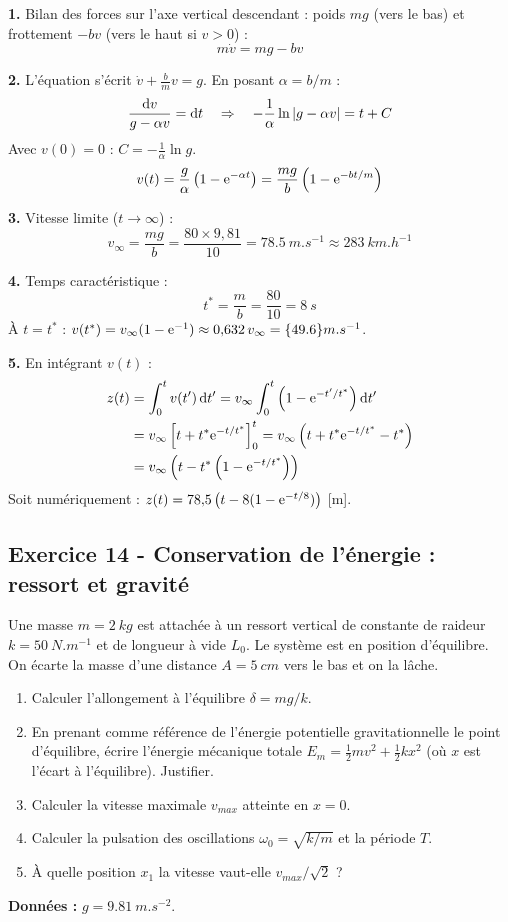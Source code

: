 \documentclass[12pt,a4paper]{article}
\begin{document}
\begin{boitecorrige}
\textbf{1.} Bilan des forces sur l'axe vertical descendant : poids $mg$ (vers le bas) et frottement $-bv$ (vers le haut si $v > 0$) :
\[
m\dot{v} = mg - bv
\]

\textbf{2.} L'équation s'écrit $\dot{v} + \frac{b}{m}v = g$. En posant $\alpha = b/m$ :
\[
\frac{\mathrm{d} v}{g - \alpha v} = \mathrm{d} t \quad \Rightarrow \quad -\frac{1}{\alpha}\ln|g - \alpha v| = t + C
\]
Avec $v(0) = 0$ : $C = -\frac{1}{\alpha}\ln g$.
\[
v(t) = \frac{g}{\alpha}\left(1 - \mathrm{e}^{-\alpha t}\right) = \frac{mg}{b}\left(1 - \mathrm{e}^{-bt/m}\right)
\]

\textbf{3.} Vitesse limite ($t \to \infty$) :
\[
v_\infty = \frac{mg}{b} = \frac{80\times9{,}81}{10} = \qty{78.5}{m.s^{-1}} \approx \qty{283}{km.h^{-1}}
\]

\textbf{4.} Temps caractéristique :
\[
t^* = \frac{m}{b} = \frac{80}{10} = \qty{8}{s}
\]
À $t = t^*$ : $v(t^*) = v_\infty(1 - \mathrm{e}^{-1}) \approx 0{,}632\,v_\infty = \qty{49.6}{m.s^{-1}}$.

\textbf{5.} En intégrant $v(t)$ :
\begin{align*}
z(t) &= \int_0^t v(t')\,\mathrm{d} t' = v_\infty\int_0^t \left(1-\mathrm{e}^{-t'/t^*}\right)\mathrm{d} t' \\
&= v_\infty\left[t + t^*\mathrm{e}^{-t/t^*}\right]_0^t = v_\infty\left(t + t^*\mathrm{e}^{-t/t^*} - t^*\right) \\
&= v_\infty\left(t - t^*\left(1 - \mathrm{e}^{-t/t^*}\right)\right)
\end{align*}
Soit numériquement : $z(t) = 78{,}5\left(t - 8(1-\mathrm{e}^{-t/8})\right)$ [m].
\end{boitecorrige}

\subsection*{Exercice 14 - Conservation de l'énergie : ressort et gravité \niveau{\moyen}}

\begin{boiteexercice}
Une masse $m = \qty{2}{kg}$ est attachée à un ressort vertical de constante de raideur $k = \qty{50}{N.m^{-1}}$ et de longueur à vide $L_0$. Le système est en position d'équilibre. On écarte la masse d'une distance $A = \qty{5}{cm}$ vers le bas et on la lâche.
\begin{enumerate}
  \item Calculer l'allongement à l'équilibre $\delta = mg/k$.
  \item En prenant comme référence de l'énergie potentielle gravitationnelle le point d'équilibre, écrire l'énergie mécanique totale $E_m = \frac{1}{2}mv^2 + \frac{1}{2}k x^2$ (où $x$ est l'écart à l'équilibre). Justifier.
  \item Calculer la vitesse maximale $v_{max}$ atteinte en $x = 0$.
  \item Calculer la pulsation des oscillations $\omega_0 = \sqrt{k/m}$ et la période $T$.
  \item À quelle position $x_1$ la vitesse vaut-elle $v_{max}/\sqrt{2}$ ?
\end{enumerate}
\textbf{Données :} $g = \qty{9.81}{m.s^{-2}}$.
\end{boiteexercice}
\end{document}
